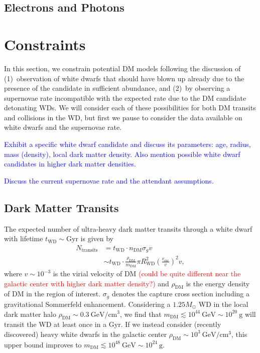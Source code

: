 \documentclass[twocolumn,showpacs,preprintnumbers,amsmath,amssymb,prd]{revtex4}
\newcommand{\GeV}{\text{GeV}}
\def\r{\right)}
\def\l{\left(}
\begin{document}
\subsection{Electrons and Photons}

\section{Constraints}
\label{sec:Constraints}

In this section, we constrain potential DM models following the discussion of \cite{Graham:2015apa} (1)~observation of white dwarfs that should have blown up already due to the presence of the candidate in sufficient abundance, and (2)~by observing a supernovae rate incompatible with the expected rate due to the DM candidate detonating WDs. We will consider each of these possibilities for both DM transits and collisions in the WD, but first we pause to consider the data available on white dwarfs and the supernovae rate.

\textcolor{blue}{Exhibit a specific white dwarf candidate and discuss its parameters: age, radius, mass (density), local dark matter density. Also mention possible white dwarf candidates in higher dark matter densities.}

\textcolor{blue}{Discuss the current supernovae rate and the attendant assumptions.}

\subsection{Dark Matter Transits}
\label{sec:TransitConstraints}

The expected number of ultra-heavy dark matter transits through a white dwarf with lifetime $t_\text{WD} \sim \text{Gyr}$ is given by
\begin{align}
N_\text{transits}  &= t_\text{WD} \cdot n_\text{DM} \sigma_g v \\
 &  \sim t_\text{WD} \cdot \frac{\rho_{\text{DM}}}{m_\text{DM}} \pi R_\text{WD}^2 \l\frac{v_\text{esc}}{v}\r^2 v,
\end{align}
where $v \sim 10^{-3}$ is the virial velocity of DM \textcolor{red}{(could be quite different near the galactic center with higher dark matter density?)} and $\rho_{\text{DM}}$ is the energy density of DM in the region of interest. $\sigma_g$ denotes the capture cross section including a gravitational Sommerfeld enhancement. Considering a $1.25 M_{\odot}$ WD in the local dark matter halo $\rho_{\text{DM}} \sim 0.3 ~\text{GeV}/\text{cm}^3$, we find that $m_\text{DM} \lesssim 10^{44} ~\GeV \sim 10^{20} ~\text{g}$ will transit the WD at least once in a Gyr. If we instead consider (recently discovered) heavy white dwarfs in the galactic center $\rho_{\text{DM}} \sim 10^3 ~\text{GeV}/\text{cm}^3$, this upper bound improves to $m_\text{DM} \lesssim 10^{48} ~\GeV \sim 10^{24} ~\text{g}$.
\end{document}
